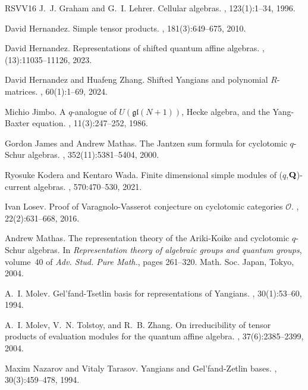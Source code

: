 \documentclass[12pt]{amsart}
\numberwithin{equation}{thm}
\newcounter{ichi}
\newcounter{ni}
\newcounter{go}
\begin{document}
\begin{thebibliography}{RSVV16}
J.~J. Graham and G.~I. Lehrer.
\newblock Cellular algebras.
, 123(1):1--34, 1996.

David Hernandez.
\newblock Simple tensor products.
, 181(3):649--675, 2010.

David Hernandez.
\newblock Representations of shifted quantum affine algebras.
, (13):11035--11126, 2023.

David Hernandez and Huafeng Zhang.
\newblock Shifted {Y}angians and polynomial {$R$}-matrices.
, 60(1):1--69, 2024.

Michio Jimbo.
\newblock A {$q$}-analogue of {$U({\mathfrak g}{\mathfrak l}(N+1))$}, {H}ecke
  algebra, and the {Y}ang-{B}axter equation.
, 11(3):247--252, 1986.

Gordon James and Andrew Mathas.
\newblock The {J}antzen sum formula for cyclotomic {$q$}-{S}chur algebras.
, 352(11):5381--5404, 2000.

Ryosuke Kodera and Kentaro Wada.
\newblock Finite dimensional simple modules of ({$q$},{$\bold{Q}$})-current
  algebras.
, 570:470--530, 2021.

Ivan Losev.
\newblock Proof of {V}aragnolo-{V}asserot conjecture on cyclotomic categories
  {$\mathcal{O}$}.
, 22(2):631--668, 2016.

Andrew Mathas.
\newblock The representation theory of the {A}riki-{K}oike and cyclotomic
  {$q$}-{S}chur algebras.
\newblock In {\em Representation theory of algebraic groups and quantum
  groups}, volume~40 of {\em Adv. Stud. Pure Math.}, pages 261--320. Math. Soc.
  Japan, Tokyo, 2004.

A.~I. Molev.
\newblock Gel'fand-{T}setlin basis for representations of {Y}angians.
, 30(1):53--60, 1994.

A.~I. Molev, V.~N. Tolstoy, and R.~B. Zhang.
\newblock On irreducibility of tensor products of evaluation modules for the
  quantum affine algebra.
, 37(6):2385--2399, 2004.

Maxim Nazarov and Vitaly Tarasov.
\newblock Yangians and {G}el'fand-{Z}etlin bases.
, 30(3):459--478, 1994.


\end{thebibliography}
\end{document}

